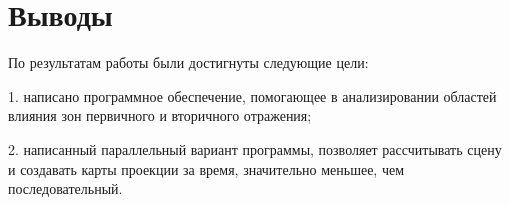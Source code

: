 \newpage
\section*{Выводы} 

По результатам работы были достигнуты следующие цели:

1. написано программное обеспечение, помогающее в анализировании областей влияния зон первичного и вторичного отражения;

2. написанный параллельный вариант программы, позволяет рассчитывать сцену и создавать карты проекции за время, значительно меньшее, чем последовательный. 

